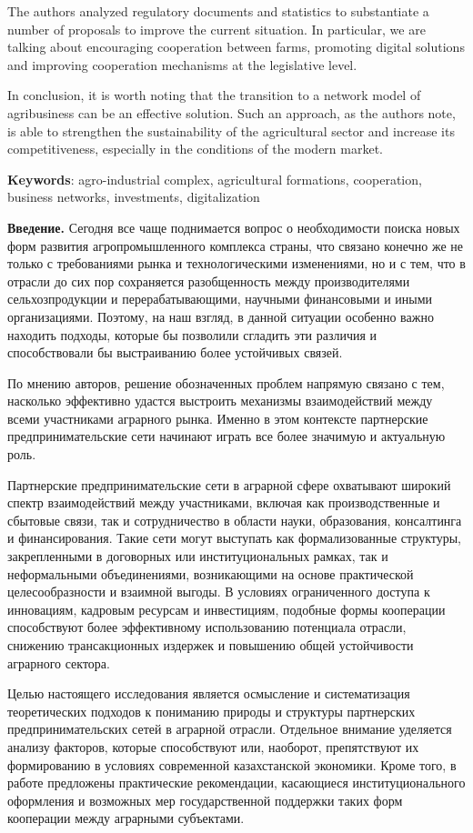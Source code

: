 The authors analyzed regulatory documents and statistics to substantiate
a number of proposals to improve the current situation. In particular,
we are talking about encouraging cooperation between farms, promoting
digital solutions and improving cooperation mechanisms at the
legislative level.

In conclusion, it is worth noting that the transition to a network model
of agribusiness can be an effective solution. Such an approach, as the
authors note, is able to strengthen the sustainability of the
agricultural sector and increase its competitiveness, especially in the
conditions of the modern market.

{\bfseries Keywords}: agro-industrial complex, agricultural formations,
cooperation, business networks, investments, digitalization

{\bfseries Введение.} Сегодня все чаще поднимается вопрос о необходимости
поиска новых форм развития агропромышленного комплекса страны, что
связано конечно же не только с требованиями рынка и технологическими
изменениями, но и с тем, что в отрасли до сих пор сохраняется
разобщенность между производителями сельхозпродукции и
перерабатывающими, научными финансовыми и иными организациями. Поэтому,
на наш взгляд, в данной ситуации особенно важно находить подходы,
которые бы позволили сгладить эти различия и способствовали бы
выстраиванию более устойчивых связей.

По мнению авторов, решение обозначенных проблем напрямую связано с тем,
насколько эффективно удастся выстроить механизмы взаимодействий между
всеми участниками аграрного рынка. Именно в этом контексте партнерские
предпринимательские сети начинают играть все более значимую и актуальную
роль.

Партнерские предпринимательские сети в аграрной сфере охватывают широкий
спектр взаимодействий между участниками, включая как производственные и
сбытовые связи, так и сотрудничество в области науки, образования,
консалтинга и финансирования. Такие сети могут выступать как
формализованные структуры, закрепленными в договорных или
институциональных рамках, так и неформальными объединениями,
возникающими на основе практической целесообразности и взаимной выгоды.
В условиях ограниченного доступа к инновациям, кадровым ресурсам и
инвестициям, подобные формы кооперации способствуют более эффективному
использованию потенциала отрасли, снижению трансакционных издержек и
повышению общей устойчивости аграрного сектора.

Целью настоящего исследования является осмысление и систематизация
теоретических подходов к пониманию природы и структуры партнерских
предпринимательских сетей в аграрной отрасли. Отдельное внимание
уделяется анализу факторов, которые способствуют или, наоборот,
препятствуют их формированию в условиях современной казахстанской
экономики. Кроме того, в работе предложены практические рекомендации,
касающиеся институционального оформления и возможных мер государственной
поддержки таких форм кооперации между аграрными субъектами.

